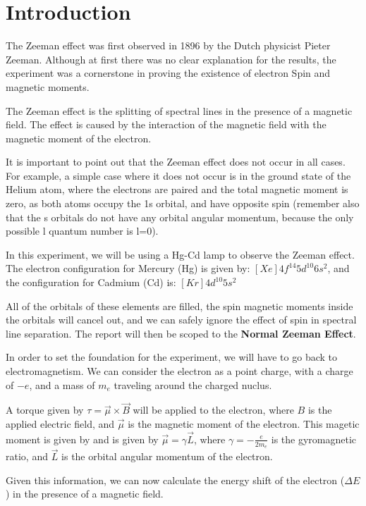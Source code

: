 \section{Introduction}

The Zeeman effect was first observed in 1896 by the Dutch physicist Pieter Zeeman. Although at first there was no clear explanation
for the results, the experiment was a cornerstone in proving the existence of electron Spin and magnetic moments.

The Zeeman effect is the splitting of spectral lines in the presence of a magnetic field. The effect is caused by the
interaction of the magnetic field with the magnetic moment of the electron.

It is important to point out that the Zeeman effect does not occur in all cases. For example, a simple case where it does not occur
is in the ground state of the Helium atom, where the electrons are paired and the total magnetic moment is zero, as both atoms occupy the 1s orbital,
and have opposite spin (remember also that the s orbitals do not have any orbital angular momentum, because the only possible l
quantum number is l=0).

In this experiment, we will be using a Hg-Cd lamp to observe the Zeeman effect. The electron configuration for Mercury (Hg) is given by: $[Xe] 4f^{14} 5d^{10} 6s^2$, and the
configuration for Cadmium (Cd) is: $[Kr] 4d^{10} 5s^2$

All of the orbitals of these elements are filled, the spin magnetic moments inside the orbitals will cancel out,
and we can safely ignore the effect of spin in spectral line separation. The report will then be scoped to the
\textbf{Normal Zeeman Effect}.

In order to set the foundation for the experiment, we will have to go back to electromagnetism.
We can consider the electron as a point charge, with a charge of $-e$, and a mass of $m_e$ traveling around the
charged nuclus.

A torque given by $\tau = \vec{\mu} \times \vec{B}$ will be applied to the electron, where  $B$ is the applied electric field, and $\vec{\mu}$ is the
magnetic moment of the electron. This magetic moment is given by
and is given by $\vec{\mu} = \gamma \vec{L}$, where $\gamma = - \frac{e}{2 m_e}$ is the gyromagnetic ratio,
and $\vec{L}$ is the orbital angular momentum of the electron.

Given this information, we can now calculate the energy shift of the electron ($\Delta E$) in the presence of a magnetic field.


